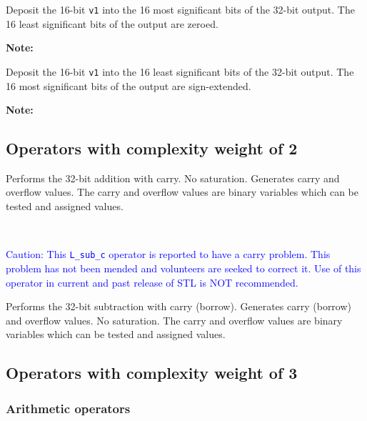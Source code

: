 
Deposit the 16-bit {\tt v1} into the 16 most significant bits
of the 32-bit output. The 16 least significant bits of the output
are zeroed.

\textbf{Note:} \hfill {}


Deposit the 16-bit {\tt v1} into the 16 least significant bits
of the 32-bit output. The 16 most significant bits of the output
are sign-extended.

\textbf{Note:} \hfill {}

\subsection{Operators with complexity weight of 2}


Performs the 32-bit addition with carry. No saturation. Generates
carry and overflow values. The carry and overflow values are
binary variables which can be tested and assigned values.

\ \\

\textcolor{blue}{
%
  Caution: This {\tt L\_sub\_c} operator is reported to have a carry problem.
  This problem has not been mended and volunteers are seeked to correct it.
  Use of this operator in current and past release of STL is NOT recommended.
%
}

Performs the 32-bit subtraction with carry (borrow). Generates
carry (borrow) and overflow values. No saturation. The carry and
overflow values are binary variables which can be tested and
assigned values.

\subsection{Operators with complexity weight of 3}
\subsubsection{Arithmetic operators}

